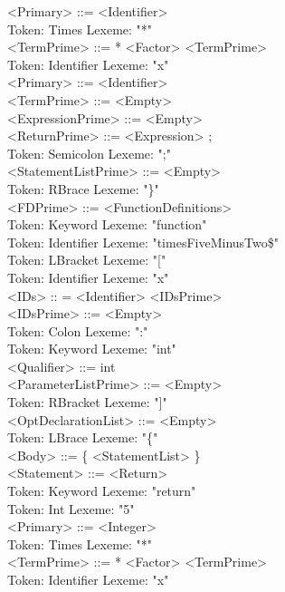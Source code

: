 \documentclass[11pt]{article}
\begin{document}
        <Primary> ::= <Identifier> \\
Token: Times     Lexeme: "*" \\
        <TermPrime> ::= * <Factor> <TermPrime> \\
Token: Identifier        Lexeme: "x" \\
        <Primary> ::= <Identifier> \\
        <TermPrime> ::= <Empty> \\
        <ExpressionPrime> ::= <Empty> \\
        <ReturnPrime> ::= <Expression> ; \\
Token: Semicolon         Lexeme: ";" \\
        <StatementListPrime> ::= <Empty> \\
Token: RBrace    Lexeme: "\}" \\
        <FDPrime> ::= <FunctionDefinitions> \\
Token: Keyword   Lexeme: "function" \\
Token: Identifier        Lexeme: "timesFiveMinusTwo\$" \\
Token: LBracket          Lexeme: "[" \\
Token: Identifier        Lexeme: "x" \\
        <IDs> :: = <Identifier> <IDsPrime> \\
        <IDsPrime> ::= <Empty> \\
Token: Colon     Lexeme: ":" \\
Token: Keyword   Lexeme: "int" \\
        <Qualifier> ::= int \\
        <ParameterListPrime> ::= <Empty> \\
Token: RBracket          Lexeme: "]" \\
        <OptDeclarationList> ::= <Empty> \\
Token: LBrace    Lexeme: "\{" \\
        <Body> ::= \{ <StatementList> \} \\
        <Statement> ::= <Return> \\
Token: Keyword   Lexeme: "return" \\
Token: Int       Lexeme: "5" \\
        <Primary> ::= <Integer> \\
Token: Times     Lexeme: "*" \\
        <TermPrime> ::= * <Factor> <TermPrime> \\
Token: Identifier        Lexeme: "x" \\
\end{document}
